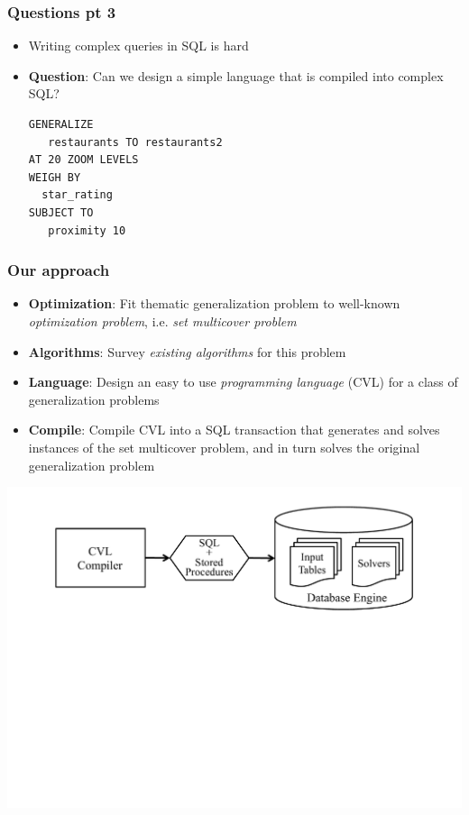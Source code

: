 \documentclass{beamer}
\begin{document}
\begin{frame}[fragile]
  \frametitle{Questions pt 3}
  \begin{itemize}
  \item Writing complex queries in SQL is hard
  \item \textbf{Question}: Can we design a simple language that is compiled into complex SQL?
\begin{lstlisting}
GENERALIZE 
   restaurants TO restaurants2
AT 20 ZOOM LEVELS
WEIGH BY
  star_rating
SUBJECT TO 
   proximity 10
\end{lstlisting}
  \end{itemize}
\end{frame}


\frame
{
  \frametitle{Our approach}
  \begin{itemize}
  \item \textbf{Optimization}: Fit thematic generalization problem to well-known \emph{optimization problem}, i.e. \emph{set multicover problem}
  \item \textbf{Algorithms}: Survey \emph{existing algorithms} for this problem
  \item \textbf{Language}: Design an easy to use \emph{programming language} (CVL) for a class of generalization problems
  \item \textbf{Compile}: Compile CVL into a SQL transaction that generates and solves instances of the set multicover problem, and in turn solves the original generalization problem

  \end{itemize}
  \begin{center}
  \includegraphics[scale=0.3]{figs/indatabase-execution.pdf}
  \end{center}
}
\end{document}
